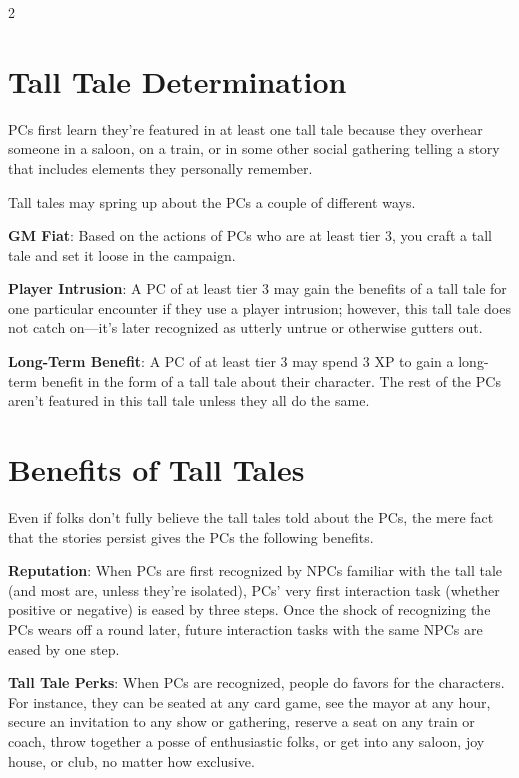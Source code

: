 \begin{multicols}{2}

\section{Tall Tale Determination}
 
PCs first learn they’re featured in at least one tall tale because they overhear someone in a saloon, on a train, or in some other social gathering telling a story that includes elements they personally remember. 

Tall tales may spring up about the PCs a couple of different ways. 

\textbf{GM Fiat}: Based on the actions of PCs who are at least tier 3, you craft a tall tale and set it loose in the campaign. 

\textbf{Player Intrusion}: A PC of at least tier 3 may gain the benefits of a tall tale for one particular encounter if they use a player intrusion; however, this tall tale does not catch on—it’s later recognized as utterly untrue or otherwise gutters out. 

\textbf{Long-Term Benefit}: A PC of at least tier 3 may spend 3 XP to gain a long-term benefit in the form of a tall tale about their character. The rest of the PCs aren’t featured in this tall tale unless they all do the same.

\section{Benefits of Tall Tales}

Even if folks don’t fully believe the tall tales told about the PCs, the mere fact that the stories persist gives the PCs the following benefits. 

\textbf{Reputation}: When PCs are first recognized by NPCs familiar with the tall tale (and most are, unless they’re isolated), PCs’ very first interaction task (whether positive or negative) is eased by three steps. Once the shock of recognizing the PCs wears off a round later, future interaction tasks with the same NPCs are eased by one step. 

\textbf{Tall Tale Perks}: When PCs are recognized, people do favors for the characters. For instance, they can be seated at any card game, see the mayor at any hour, secure an invitation to any show or gathering, reserve a seat on any train or coach, throw together a posse of enthusiastic folks, or get into any saloon, joy house, or club, no matter how exclusive. 


\end{multicols}
